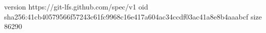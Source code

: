 version https://git-lfs.github.com/spec/v1
oid sha256:41cb40579566f57243c61fc9968c16e417a604ac34ccdf03ac41a8e8b4aaabcf
size 86290
